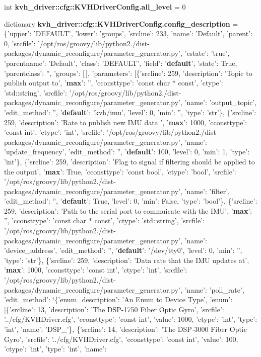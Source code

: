 \begin{DoxyCompactItemize}
\item 
int {\bf kvh\-\_\-driver\-::cfg\-::\-K\-V\-H\-Driver\-Config.\-all\-\_\-level} = 0
\item 
dictionary {\bf kvh\-\_\-driver\-::cfg\-::\-K\-V\-H\-Driver\-Config.\-config\-\_\-description} = \{'upper'\-: '\-D\-E\-F\-A\-U\-L\-T', 'lower'\-: 'groups', 'srcline'\-: 233, 'name'\-: '\-Default', 'parent'\-: 0, 'srcfile'\-: '/opt/ros/groovy/lib/python2./dist-\/packages/dynamic\-\_\-reconfigure/parameter\-\_\-generator.\-py', 'cstate'\-: 'true', 'parentname'\-: '\-Default', 'class'\-: '\-D\-E\-F\-A\-U\-L\-T', 'field'\-: '{\bf default}', 'state'\-: \-True, 'parentclass'\-: '', 'groups'\-: [$\,$], 'parameters'\-: [\{'srcline'\-: 259, 'description'\-: '\-Topic to publish output to', '{\bf max}'\-: '', 'cconsttype'\-: 'const char $\ast$ const', 'ctype'\-: 'std\-::string', 'srcfile'\-: '/opt/ros/groovy/lib/python2./dist-\/packages/dynamic\-\_\-reconfigure/parameter\-\_\-generator.\-py', 'name'\-: 'output\-\_\-topic', 'edit\-\_\-method'\-: '', '{\bf default}'\-: 'kvh/imu', 'level'\-: 0, 'min'\-: '', 'type'\-: 'str'\}, \{'srcline'\-: 259, 'description'\-: '\-Rate to publish new \-I\-M\-U data ', '{\bf max}'\-: 1000, 'cconsttype'\-: 'const int', 'ctype'\-: 'int', 'srcfile'\-: '/opt/ros/groovy/lib/python2./dist-\/packages/dynamic\-\_\-reconfigure/parameter\-\_\-generator.\-py', 'name'\-: 'update\-\_\-frequency', 'edit\-\_\-method'\-: '', '{\bf default}'\-: 100, 'level'\-: 0, 'min'\-: 1, 'type'\-: 'int'\}, \{'srcline'\-: 259, 'description'\-: '\-Flag to signal if filtering should be applied to the output', '{\bf max}'\-: \-True, 'cconsttype'\-: 'const bool', 'ctype'\-: 'bool', 'srcfile'\-: '/opt/ros/groovy/lib/python2./dist-\/packages/dynamic\-\_\-reconfigure/parameter\-\_\-generator.\-py', 'name'\-: 'filter', 'edit\-\_\-method'\-: '', '{\bf default}'\-: \-True, 'level'\-: 0, 'min'\-: \-False, 'type'\-: 'bool'\}, \{'srcline'\-: 259, 'description'\-: '\-Path to the serial port to commuicate with the \-I\-M\-U', '{\bf max}'\-: '', 'cconsttype'\-: 'const char $\ast$ const', 'ctype'\-: 'std\-::string', 'srcfile'\-: '/opt/ros/groovy/lib/python2./dist-\/packages/dynamic\-\_\-reconfigure/parameter\-\_\-generator.\-py', 'name'\-: 'device\-\_\-address', 'edit\-\_\-method'\-: '', '{\bf default}'\-: '/dev/tty0', 'level'\-: 0, 'min'\-: '', 'type'\-: 'str'\}, \{'srcline'\-: 259, 'description'\-: '\-Data rate that the \-I\-M\-U updates at', '{\bf max}'\-: 1000, 'cconsttype'\-: 'const int', 'ctype'\-: 'int', 'srcfile'\-: '/opt/ros/groovy/lib/python2./dist-\/packages/dynamic\-\_\-reconfigure/parameter\-\_\-generator.\-py', 'name'\-: 'poll\-\_\-rate', 'edit\-\_\-method'\-: \char`\"{}\{'enum\-\_\-description'\-: '\-An \-Enum to \-Device \-Type', 'enum'\-: [\{'srcline'\-: 13, 'description'\-: '\-The \-D\-S\-P-\/1750 \-Fiber \-Optic \-Gyro', 'srcfile'\-: '../cfg/\-K\-V\-H\-Driver.\-cfg', 'cconsttype'\-: 'const int', 'value'\-: 1000, 'ctype'\-: 'int', 'type'\-: 'int', 'name'\-: '\-D\-S\-P\-\_'\}, \{'srcline'\-: 14, 'description'\-: '\-The \-D\-S\-P-\/3000 \-Fiber \-Optic \-Gyro', 'srcfile'\-: '../cfg/\-K\-V\-H\-Driver.\-cfg', 'cconsttype'\-: 'const int', 'value'\-: 100, 'ctype'\-: 'int', 'type'\-: 'int', 'name'\-: 
\end{DoxyCompactItemize}
